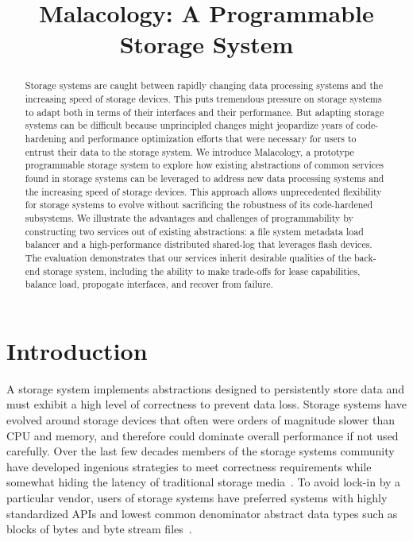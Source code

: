 \documentclass[preprint]{sigplanconf-eurosys}
\title{Malacology: A Programmable Storage System}
\date{}
\begin{document}
\maketitle

\begin{abstract}
Storage systems are caught between rapidly changing data
processing systems and the increasing speed of storage devices. This puts
tremendous pressure on storage systems to adapt both in terms of their
interfaces and their performance. But adapting storage systems can be difficult
because unprincipled changes might jeopardize years of code-hardening and
performance optimization efforts that were necessary for users to entrust their
data to the storage system.  We introduce  Malacology, a prototype programmable
storage system to explore how existing abstractions of common services found in
storage systems can be leveraged to address new data processing systems and the
increasing speed of storage devices. This approach allows unprecedented
flexibility for storage systems to evolve without sacrificing the robustness of
its code-hardened subsystems.  We illustrate the advantages and challenges of
programmability by constructing two services out of existing abstractions: a
file system metadata load balancer and a high-performance distributed
shared-log that leverages flash devices. The evaluation demonstrates that our
services inherit desirable qualities of the back-end storage system, including
the ability to make trade-offs for lease capabilities, balance load, propogate
interfaces, and recover from failure.
\end{abstract}

\section{Introduction}
\label{introduction}
\label{sec:intro}

A storage system implements abstractions designed to persistently store data
and must exhibit a high level of correctness to prevent data loss.  Storage
systems have evolved around storage devices that often were orders of magnitude
slower than CPU and memory, and therefore could dominate overall performance if
not used carefully. Over the last few decades members of the storage systems
community have developed ingenious strategies to meet correctness requirements
while somewhat hiding the latency of traditional storage
media~\cite{brewer_disks_2016}. To avoid lock-in by a particular vendor, users
of storage systems have preferred systems with highly standardized APIs and
lowest common denominator abstract data types such as blocks of bytes and byte
stream files~\cite{armbrust_view_2010}.
\end{document}

